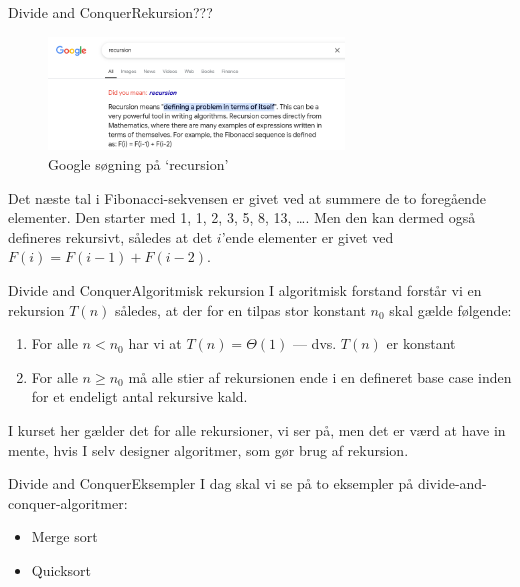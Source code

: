 \documentclass[aspectratio=1610]{beamer}
\begin{document}
\begin{frame}{Divide and Conquer}{Rekursion???}
    \begin{figure}[h]
        \centering
        \includegraphics[width=0.7\textwidth]{recursion}
        \caption{Google søgning på `recursion'}
        \label{fig:recursion}
    \end{figure}

    \pause
    \begin{example}
        Det næste tal i Fibonacci-sekvensen er givet ved at summere de to
        foregående elementer. Den starter med 1, 1, 2, 3, 5, 8, 13, \ldots. Men
        den kan dermed også defineres rekursivt, således at det $i$'ende
        elementer er givet ved $F(i) = F(i-1) + F(i-2)$.
    \end{example}
\end{frame}

\begin{frame}{Divide and Conquer}{Algoritmisk rekursion}
    I algoritmisk forstand forstår vi en rekursion $T(n)$ således, at der for en
    tilpas stor konstant $n_0$ skal gælde følgende:

    \begin{enumerate}
        \item For alle $n < n_0$ har vi at $T(n) = \Theta(1)$ --- dvs. $T(n)$ er
            konstant
        \item For alle $n \geq n_0$ må alle stier af rekursionen ende i en
            defineret base case inden for et \alert{endeligt} antal rekursive
            kald.
    \end{enumerate}

    \pause
    I kurset her gælder det for alle rekursioner, vi ser på, men det er værd at
    have in mente, hvis I selv designer algoritmer, som gør brug af rekursion.
\end{frame}

\begin{frame}{Divide and Conquer}{Eksempler}
    I dag skal vi se på to eksempler på divide-and-conquer-algoritmer:

    \begin{itemize}
        \item Merge sort
        \item Quicksort
    \end{itemize}
\end{frame}
\end{document}
